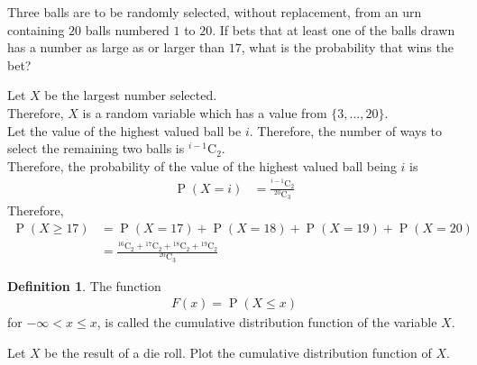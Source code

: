 \documentclass[titlepage, fleqn, a4paper, 12pt, twoside]{article}
\theoremstyle{definition}
\newtheorem{definition}{Definition}
\theoremstyle{theorem}
\DeclareMathOperator{\prob}{\mathrm{P}}
\newcommand*{\comb}[2]{{}^{#1}\mathrm{C}_{#2}}%
\newcommand{\A}{\text{Alice}\xspace}
\begin{document}
\begin{question}
	Three balls are to be randomly selected, without replacement, from an urn containing $20$ balls numbered $1$ to $20$.
	If \A bets that at least one of the balls drawn has a number as large as or larger than $17$, what is the probability that \A wins the bet?
\end{question}

\begin{solution}
	Let $X$ be the largest number selected.\\
	Therefore, $X$ is a random variable which has a value from $\{3,\dots,20\}$.\\
	Let the value of the highest valued ball be $i$.
	Therefore, the number of ways to select the remaining two balls is $\comb{i - 1}{2}$.\\
	Therefore, the probability of the value of the highest valued ball being $i$ is
	\begin{align*}
		\prob(X = i) & = \frac{\comb{i - 1}{2}}{\comb{20}{3}}
	\end{align*}
	Therefore,
	\begin{align*}
		\prob(X \ge 17) & = \prob(X = 17) + \prob(X = 18) + \prob(X = 19) + \prob(X = 20) \\
                                & = \frac{\comb{16}{2} + \comb{17}{2} + \comb{18}{2} + \comb{19}{2}}{\comb{20}{3}}
	\end{align*}
\end{solution}

\begin{definition}
	The function
	\begin{align*}
		F(x) = \prob(X \le x)
	\end{align*}
	for $-\infty < x \le x$, is called the cumulative distribution function of the variable $X$.
\end{definition}

\begin{question}
	Let $X$ be the result of a die roll.
	Plot the cumulative distribution function of $X$.
\end{question}
\end{document}
